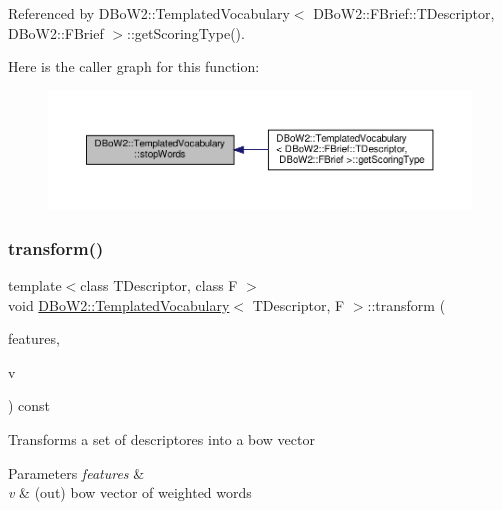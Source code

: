 Referenced by D\+Bo\+W2\+::\+Templated\+Vocabulary$<$ D\+Bo\+W2\+::\+F\+Brief\+::\+T\+Descriptor, D\+Bo\+W2\+::\+F\+Brief $>$\+::get\+Scoring\+Type().

Here is the caller graph for this function\+:\nopagebreak
\begin{figure}[H]
\begin{center}
\leavevmode
\includegraphics[width=350pt]{classDBoW2_1_1TemplatedVocabulary_a0b6721fde54bd8cd008f6a120398741e_icgraph}
\end{center}
\end{figure}
\mbox{\label{classDBoW2_1_1TemplatedVocabulary_a01de3bebec37624439c7d3baf6651ff0}} 
\subsubsection{\texorpdfstring{transform()}{transform()}\hspace{0.1cm}{\footnotesize\ttfamily [1/5]}}
{\footnotesize\ttfamily template$<$class T\+Descriptor, class F $>$ \\
void \hyperlink{classDBoW2_1_1TemplatedVocabulary}{D\+Bo\+W2\+::\+Templated\+Vocabulary}$<$ T\+Descriptor, F $>$\+::transform (\begin{DoxyParamCaption}\item[{const std\+::vector$<$ T\+Descriptor $>$ \&}]{features,  }\item[{\hyperlink{classDBoW2_1_1BowVector}{Bow\+Vector} \&}]{v }\end{DoxyParamCaption}) const\hspace{0.3cm}{\ttfamily [virtual]}}

Transforms a set of descriptores into a bow vector 
\begin{DoxyParams}{Parameters}
{\em features} & \\
\hline
{\em v} & (out) bow vector of weighted words \\
\hline
\end{DoxyParams}


